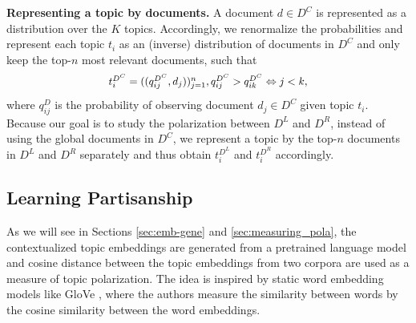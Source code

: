 \documentclass[11pt]{article}
\begin{document}
\textbf{Representing a topic by documents.} 
A document $d \in D^C$ is represented as a distribution over the $K$ topics. 
Accordingly, we renormalize the probabilities and represent each topic $t_i$ as an (inverse) distribution of documents in $D^C$ and only keep the top-$n$ most relevant documents, such that
\begin{equation}
\label{eq:topic2doc}
\scalebox{0.95}{$t_i^{D^C} = ( (q_{ij}^{D^C}, d_j) )_{j=1}^n, q_{ij}^{D^C}>q_{ik}^{D^C} \Leftrightarrow j<k,$}
\end{equation}
where $q_{ij}^D$ is the probability of observing document $d_j \in D^C$ given topic $t_i$. 
Because our goal is to study the polarization between $D^L$ and $D^R$, instead of using the global documents in $D^C$, we represent a topic by the top-$n$ documents in $D^L$ and $D^R$ separately and thus obtain $t_i^{D^L}$ and $t_i^{D^R}$ accordingly.

\subsection{Learning Partisanship}
\label{sec:learn-political-learning}
As we will see in Sections \ref{sec:emb-gene} and \ref{sec:measuring_pola}, the contextualized topic embeddings are generated from a pretrained language model \cite{devlin2018bert} and cosine distance between the topic embeddings from two corpora are used as a measure of topic polarization. The idea is inspired by static word embedding models like GloVe \cite{pennington2014glove}, where the authors measure the similarity between words by the cosine similarity between the word embeddings. 
\end{document}
